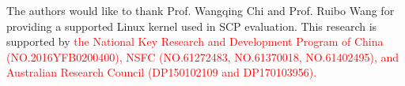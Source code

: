 \documentclass[format=acmsmall, review=true, screen=true, anonymous=false]{acmart}
\begin{document}



\begin{acks}

The authors would like to thank Prof. Wangqing Chi and Prof. Ruibo Wang
for providing a supported Linux kernel used in SCP evaluation.
This research is supported by
\textcolor{red}{
the National Key Research and Development Program 
of China (NO.2016YFB0200400), NSFC (NO.61272483, 
NO.61370018, NO.61402495), and Australian
Research Council (DP150102109 and DP170103956).
}


\end{acks}



\end{document}

